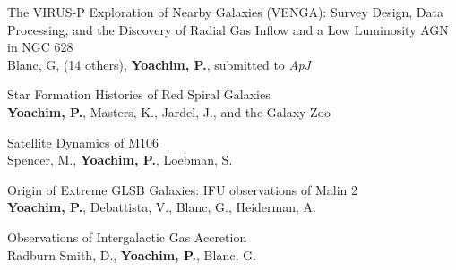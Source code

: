 \documentclass[10pt]{cv}
\begin{document}
\begin{llist}
{\sc The VIRUS-P Exploration of Nearby Galaxies (VENGA):  Survey Design, Data Processing, and the Discovery of Radial Gas Inflow and a Low Luminosity AGN in NGC 628}\\
Blanc, G, (14 others), {\bf Yoachim, P.}, submitted to {\it ApJ}


{\sc Star Formation Histories of Red Spiral Galaxies} \\
{\bf Yoachim, P.}, Masters, K., Jardel, J., and the Galaxy Zoo



{\sc Satellite Dynamics of M106}\\
Spencer, M., {\bf Yoachim, P.}, Loebman, S.

{\sc Origin of Extreme GLSB Galaxies:  IFU observations of Malin 2}\\
{\bf Yoachim, P.}, Debattista, V., Blanc, G., Heiderman, A.




{\sc Observations of Intergalactic Gas Accretion} \\
Radburn-Smith, D., {\bf Yoachim, P.},  Blanc, G.




\end{llist}


\vspace{1.2cm}
\footnotesize
\end{document}
